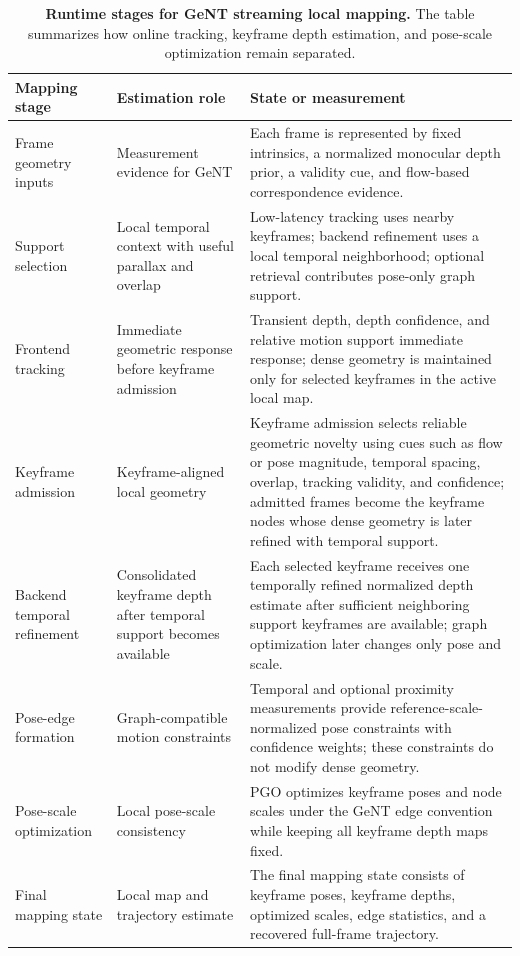 \begin{table}[!t]
    \centering
    \caption{\textbf{Runtime stages for GeNT streaming local mapping.}
    The table summarizes how online tracking, keyframe depth estimation, and pose-scale optimization remain separated.}
    \label{tab:geont_runtime_stages}
    \small
    \setlength{\tabcolsep}{4pt}
    \renewcommand{\arraystretch}{1.12}
    \begin{tabular*}{\textwidth}{@{\extracolsep{\fill}}p{}p{}p{}@{}}
        \toprule
        \textbf{Mapping stage} & \textbf{Estimation role} & \textbf{State or measurement} \\
        \midrule
        Frame geometry inputs &
        Measurement evidence for GeNT &
        Each frame is represented by fixed intrinsics, a normalized monocular depth prior, a validity cue, and flow-based correspondence evidence. \\
        Support selection &
        Local temporal context with useful parallax and overlap &
        Low-latency tracking uses nearby keyframes; backend refinement uses a local temporal neighborhood; optional retrieval contributes pose-only graph support. \\
        Frontend tracking &
        Immediate geometric response before keyframe admission &
        Transient depth, depth confidence, and relative motion support immediate response; dense geometry is maintained only for selected keyframes in the active local map. \\
        Keyframe admission &
        Keyframe-aligned local geometry &
        Keyframe admission selects reliable geometric novelty using cues such as flow or pose magnitude, temporal spacing, overlap, tracking validity, and confidence; admitted frames become the keyframe nodes whose dense geometry is later refined with temporal support. \\
        Backend temporal refinement &
        Consolidated keyframe depth after temporal support becomes available &
        Each selected keyframe receives one temporally refined normalized depth estimate after sufficient neighboring support keyframes are available; graph optimization later changes only pose and scale. \\
        Pose-edge formation &
        Graph-compatible motion constraints &
        Temporal and optional proximity measurements provide reference-scale-normalized pose constraints with confidence weights; these constraints do not modify dense geometry. \\
        Pose-scale optimization &
        Local pose-scale consistency &
        PGO optimizes keyframe poses and node scales under the GeNT edge convention while keeping all keyframe depth maps fixed. \\
        Final mapping state &
        Local map and trajectory estimate &
        The final mapping state consists of keyframe poses, keyframe depths, optimized scales, edge statistics, and a recovered full-frame trajectory. \\
        \bottomrule
    \end{tabular*}
\end{table}

